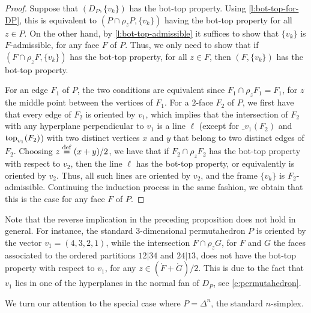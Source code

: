 \begin{proof}
	Suppose that $(D_P,\{v_k\})$ has the bot-top property.
	Using \cref{l:bot-top-for-DP}, this is equivalent to $(P\cap\rho_z P, \{v_k\})$ having the bot-top property for all $z \in P$. 
	On the other hand, by \cref{l:bot-top-admissible} it suffices to show that $\{v_k\}$ is $F$-admissible, for any face $F$ of $P$.
	Thus, we only need to show that if $(F \cap \rho_z F, \{v_k\})$ has the bot-top property, for all $z \in F$, then $(F,\{v_k\})$ has the bot-top property. 
	
	For an edge $F_1$ of $P$, the two conditions are equivalent since $F_1 \cap \rho_z F_1 = F_1$, for $z$ the middle point between the vertices of $F_1$.
	For a $2$-face $F_2$ of $P$, we first have that every edge of $F_2$ is oriented by $v_1$, which implies that the intersection of $F_2$ with any hyperplane perpendicular to $v_1$ is a line $\ell$ (except for $\bm_{v_1}(F_2)$ and $\operatorname{top}_{v_1}(F_2)$) with two distinct vertices $x$ and $y$ that belong to two distinct edges of $F_2$. 
	Choosing $z \stackrel{\mathrm{def}}{=} (x+y)/2$, we have that if $F_2 \cap \rho_z F_2$ has the bot-top property with respect to $v_2$, then the line $\ell$ has the bot-top property, or equivalently is oriented by $v_2$. 
	Thus, all such lines are oriented by $v_2$, and the frame $\{v_k\}$ is $F_2$-admissible. 
	Continuing the induction process in the same fashion, we obtain that this is the case for any face $F$ of $P$. 
\end{proof}

\begin{example}
	Note that the reverse implication in the preceding proposition does not hold in general.  
	For instance, the standard $3$-dimensional permutahedron $P$ is oriented by the vector $v_1=(4,3,2,1)$, while the intersection $F \cap \rho_z G$, for $F$ and $G$ the faces associated to the ordered partitions $12|34$ and $24|13$, does not have the bot-top property with respect to $v_1$, for any $z \in (\mathring F + \mathring G)/2$.
	This is due to the fact that $v_1$ lies in one of the hyperplanes in the normal fan of $D_P$, see \cref{e:permutahedron}. 
\end{example}



We turn our attention to the special case where $P=\Delta^n$, the standard $n$-simplex. 

